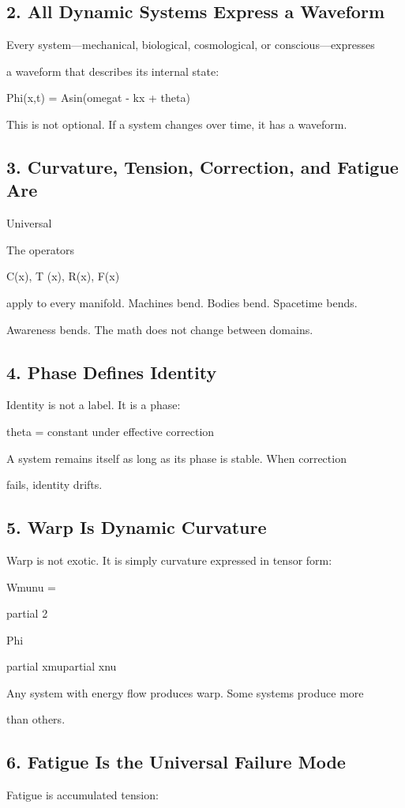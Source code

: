 \documentclass[10pt]{article}
\begin{document}
\subsection*{2. All Dynamic Systems Express a Waveform}
Every system---mechanical, biological, cosmological, or conscious---expresses

a waveform that describes its internal state:

Phi(x,t) = Asin(omegat - kx + theta)

This is not optional. If a system changes over time, it has a waveform.

\subsection*{3. Curvature, Tension, Correction, and Fatigue Are}
Universal

The operators

C(x), T (x), R(x), F(x)

apply to every manifold. Machines bend. Bodies bend. Spacetime bends.

Awareness bends. The math does not change between domains.

\subsection*{4. Phase Defines Identity}
Identity is not a label. It is a phase:

theta = constant under effective correction

A system remains itself as long as its phase is stable. When correction

fails, identity drifts.


\subsection*{5. Warp Is Dynamic Curvature}
Warp is not exotic. It is simply curvature expressed in tensor form:

Wmunu =

partial 2

Phi

partial xmupartial xnu

Any system with energy flow produces warp. Some systems produce more

than others.

\subsection*{6. Fatigue Is the Universal Failure Mode}
Fatigue is accumulated tension:
\end{document}
